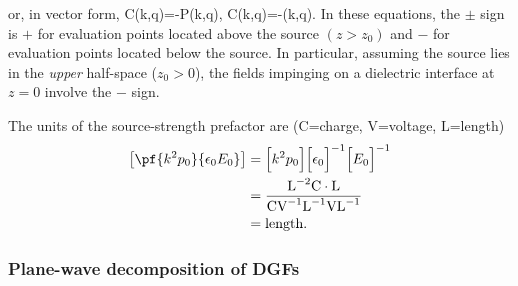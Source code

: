 \documentclass[letterpaper]{article}
\begin{document}
or, in vector form,
{
 \vb C(k,\vb q)=-\vb P(k,\vb q),
 \qquad
 \vb C(k,\vb q)=-(k,\vb q).
}
In these equations, the $\pm$ sign is $+$ for evaluation points 
located above the source $(z>z_0)$ and $-$ for evaluation points
located below the source. In particular, assuming the 
source lies in the \textit{upper} half-space ($z_0>0$), 
the fields impinging on a dielectric interface at $z=0$
involve the $-$ sign.

The units of the source-strength prefactor are
($\text{C}$=charge, $\text{V}$=voltage, $\text{L}$=length)
\begin{align*}
\left[\pf{k^2 p_0}{\epsilon_0 E_0}\right]
&= \Big[k^2 p_0\Big]\Big[\epsilon_0\Big]^{-1} \Big[E_0\Big]^{-1} 
\\
&= \frac{\text{L}^{-2} \text{C}\cdot \text{L}}
        {\text{C} \text{V}^{-1} \text{L}^{-1} \text{V} \text{L}^{-1}}
\\
&= \text{length}.
\end{align*}

\subsubsection{Plane-wave decomposition of DGFs}
\end{document}
